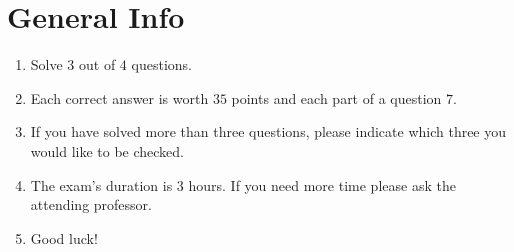 \documentclass{article}
\begin{document}


\section*{General Info}
\begin{enumerate}
\item Solve $3$ out of $4$ questions.
\item Each correct answer is worth $35$ points and each part of a question $7$.
\item If you have solved more than three questions, please indicate which three you would like to be checked.
\item The exam's duration is 3 hours. If you need more time please ask the attending professor.
\item Good luck!
\end{enumerate}
\end{document}
